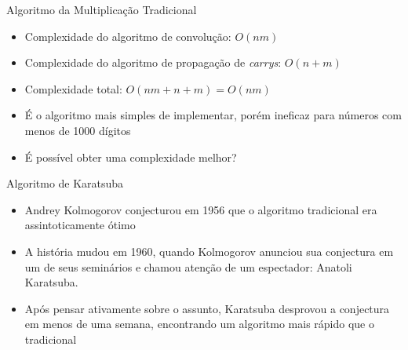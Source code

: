 \documentclass{beamer}
\begin{document}
\begin{frame}{Algoritmo da Multiplicação Tradicional}
	\begin{itemize}
		\item Complexidade do algoritmo de convolução: $O(nm)$
		\item Complexidade do algoritmo de propagação de \textit{carrys}: $O(n+m)$
		\item Complexidade total: $O(nm+n+m)=O(nm)$
		\item É o algoritmo mais simples de implementar, porém ineficaz para números com menos de 1000 dígitos
		\item É possível obter uma complexidade melhor?
	\end{itemize}
\end{frame}

\begin{frame}{Algoritmo de Karatsuba}
	\begin{itemize}
		\item Andrey Kolmogorov conjecturou em 1956 que o algoritmo tradicional era assintoticamente ótimo
		\item A história mudou em 1960, quando Kolmogorov anunciou sua conjectura em um de seus seminários e chamou atenção de um espectador: Anatoli Karatsuba.
		\item Após pensar ativamente sobre o assunto, Karatsuba desprovou a conjectura em menos de uma semana, encontrando um algoritmo mais rápido que o tradicional
	\end{itemize}
\end{frame}
\end{document}
